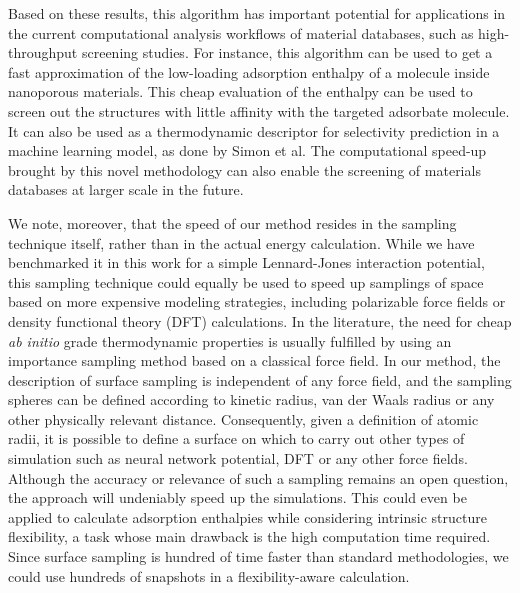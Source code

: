 \documentclass[main]{subfiles}
\begin{document}
Based on these results, this algorithm has important potential for applications in the current computational analysis workflows of material databases, such as high-throughput screening studies. For instance, this algorithm can be used to get a fast approximation of the low-loading adsorption enthalpy of a molecule inside nanoporous materials. This cheap evaluation of the enthalpy can be used to screen out the structures with little affinity with the targeted adsorbate molecule. It can also be used as a thermodynamic descriptor for selectivity prediction in a machine learning model, as done by Simon et al.\cite{Simon_2015} The computational speed-up brought by this novel methodology can also enable the screening of materials databases at larger scale in the future.

We note, moreover, that the speed of our method resides in the sampling technique itself, rather than in the actual energy calculation. While we have benchmarked it in this work for a simple Lennard-Jones interaction potential, this sampling technique could equally be used to speed up samplings of space based on more expensive modeling strategies, including polarizable force fields or density functional theory (DFT) calculations. In the literature, the need for cheap \emph{ab initio} grade thermodynamic properties is usually fulfilled by using an importance sampling method based on a classical force field.\cite{Vandenbrande2018} In our method, the description of surface sampling is independent of any force field, and the sampling spheres can be defined according to kinetic radius, van der Waals radius or any other physically relevant distance. {Consequently, given a definition of atomic radii, it is possible to define a surface on which to carry out other types of simulation such as neural network potential, DFT or any other force fields. Although the accuracy or relevance of such a sampling remains an open question, the approach will undeniably speed up the simulations.} This could even be applied to calculate adsorption enthalpies while considering intrinsic structure flexibility,\cite{Witman_2017} a task whose main drawback is the high computation time required. Since surface sampling is hundred of time faster than standard methodologies, we could use hundreds of snapshots in a flexibility-aware calculation.
\end{document}
